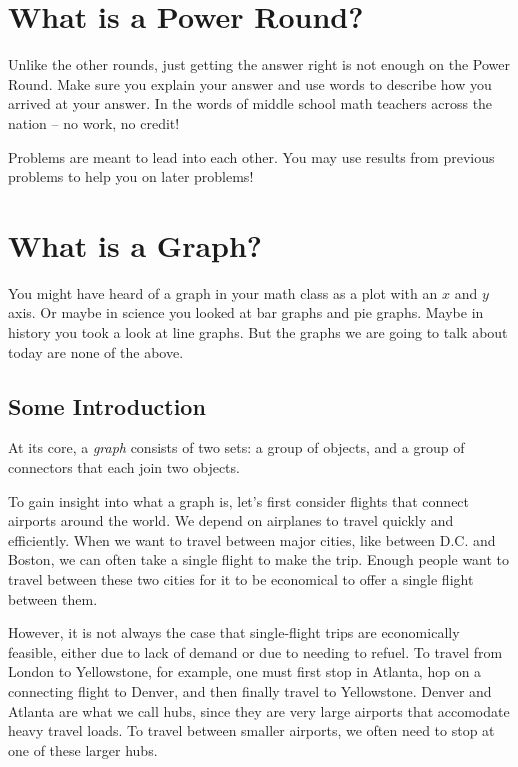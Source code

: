 \documentclass[11pt]{article}
\begin{document}
\section{What is a Power Round?}

Unlike the other rounds, just getting the answer right is not enough on the Power Round. Make sure you explain your answer and use words
to describe how you arrived at your answer. In the words of middle school math teachers across the nation -- no work, no credit!

Problems are meant to lead into each other. You may use results from previous problems to help you on later problems!

\section{What is a Graph?}

You might have heard of a graph in your math class as a plot with an $x$ and $y$ axis. Or maybe in science you looked at
bar graphs and pie graphs. Maybe in history you took a look at line graphs. But the graphs we are going to talk about today
are none of the above.

\subsection{Some Introduction}

At its core, a \textit{graph} consists of two sets: a group of objects, and a group of connectors that each join two objects.

To gain insight into what a graph is, let's first consider flights that connect airports around the world.
We depend on airplanes to travel quickly and efficiently. When we want to travel between major cities,
like between D.C. and Boston, we can often take a single flight to make the trip. Enough people want to travel between
these two cities for it to be economical to offer a single flight between them.

However, it is not always the case that single-flight trips are economically feasible, either due to lack of demand
or due to needing to refuel. To travel from London to Yellowstone, for example, one must first stop in Atlanta, hop
on a connecting flight to Denver, and then finally travel to Yellowstone. Denver and Atlanta are what we call
hubs, since they are very large airports that accomodate heavy travel loads. To travel between smaller airports, we often
need to stop at one of these larger hubs.
\end{document}

